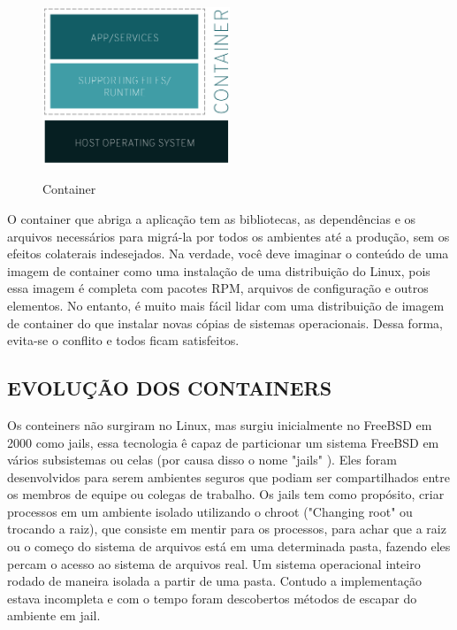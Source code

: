 \begin{figure}[!htb]
	\centering
	\caption{Container}
	\includegraphics[width=0.5\textwidth]{figuras/what-is-a-container.png}
	\label{fig:figura-exemplo1}
\end{figure}

O container que abriga a aplicação tem as bibliotecas, as dependências e os arquivos necessários para migrá-la por todos os ambientes até a produção, sem os efeitos colaterais indesejados. Na verdade, você deve imaginar o conteúdo de uma imagem de container como uma instalação de uma distribuição do Linux, pois essa imagem é completa com pacotes RPM, arquivos de configuração e outros elementos. No entanto, é muito mais fácil lidar com uma distribuição de imagem de container do que instalar novas cópias de sistemas operacionais. Dessa forma, evita-se o conflito e todos ficam satisfeitos.

\subsection{EVOLUÇÃO DOS CONTAINERS}

Os conteiners não surgiram no Linux, mas surgiu inicialmente no FreeBSD em 2000 como jails, essa tecnologia ê capaz de particionar um sistema FreeBSD em vários subsistemas ou celas (por causa disso o nome "jails" ). Eles foram desenvolvidos para serem ambientes seguros que podiam ser compartilhados entre os membros de equipe ou colegas de trabalho. Os jails tem como propósito, criar processos em um ambiente isolado utilizando o chroot ("Changing root" ou trocando a raiz), que consiste em mentir para os processos, para achar que a raiz ou o começo do sistema de arquivos está em uma determinada pasta, fazendo eles percam o acesso ao sistema de arquivos real. Um sistema operacional inteiro rodado  de maneira isolada a partir de uma pasta.  Contudo a implementação estava incompleta e com o tempo foram descobertos métodos de escapar do ambiente em jail. 


